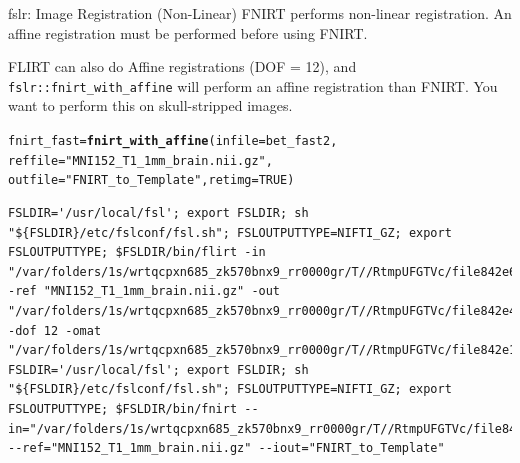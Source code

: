 \documentclass[11pt]{beamer}\usepackage[]{graphicx}\usepackage[]{color}
\makeatletter
\newcommand{\hlnum}[1]{\textcolor[rgb]{0.686,0.059,0.569}{#1}}%
\newcommand{\hlstr}[1]{\textcolor[rgb]{0.192,0.494,0.8}{#1}}%
\newcommand{\hlstd}[1]{\textcolor[rgb]{0.345,0.345,0.345}{#1}}%
\newcommand{\hlkwb}[1]{\textcolor[rgb]{0.69,0.353,0.396}{#1}}%
\newcommand{\hlkwc}[1]{\textcolor[rgb]{0.333,0.667,0.333}{#1}}%
\newcommand{\hlkwd}[1]{\textcolor[rgb]{0.737,0.353,0.396}{\textbf{#1}}}%
\newenvironment{kframe}{%
 \def\at@end@of@kframe{}%
 \ifinner\ifhmode%
  \def\at@end@of@kframe{\end{minipage}}%
  \begin{minipage}{\columnwidth}%
 \fi\fi%
 \def\FrameCommand##1{\hskip\@totalleftmargin \hskip-\fboxsep
 \colorbox{shadecolor}{##1}\hskip-\fboxsep
     \hskip-\linewidth \hskip-\@totalleftmargin \hskip\columnwidth}%
 \MakeFramed {\advance\hsize-\width
   \@totalleftmargin\z@ \linewidth\hsize
   \@setminipage}}%
 {\par\unskip\endMakeFramed%
 \at@end@of@kframe}
\newenvironment{knitrout}{}{} %
\makeatother
\begin{document}
\begin{frame}[fragile]{fslr: Image Registration (Non-Linear)}
FNIRT performs non-linear registration. An affine registration must be performed before using FNIRT.

FLIRT can also do Affine registrations (DOF = 12), and \verb|fslr::fnirt_with_affine| will perform an affine registration than FNIRT.  You want to perform this on skull-stripped images. 


\begin{knitrout}
\color{fgcolor}\begin{kframe}
\begin{alltt}
\hlstd{fnirt_fast} \hlkwb{=} \hlkwd{fnirt_with_affine}\hlstd{(}\hlkwc{infile}\hlstd{=bet_fast2,}
        \hlkwc{reffile} \hlstd{=} \hlstr{"MNI152_T1_1mm_brain.nii.gz"}\hlstd{,}
        \hlkwc{outfile} \hlstd{=} \hlstr{"FNIRT_to_Template"}\hlstd{,} \hlkwc{retimg}\hlstd{=}\hlnum{TRUE}\hlstd{)}
\end{alltt}
\begin{verbatim}
FSLDIR='/usr/local/fsl'; export FSLDIR; sh "${FSLDIR}/etc/fslconf/fsl.sh"; FSLOUTPUTTYPE=NIFTI_GZ; export FSLOUTPUTTYPE; $FSLDIR/bin/flirt -in "/var/folders/1s/wrtqcpxn685_zk570bnx9_rr0000gr/T//RtmpUFGTVc/file842e65483fd1.nii.gz" -ref "MNI152_T1_1mm_brain.nii.gz" -out "/var/folders/1s/wrtqcpxn685_zk570bnx9_rr0000gr/T//RtmpUFGTVc/file842e43b800fa" -dof 12 -omat "/var/folders/1s/wrtqcpxn685_zk570bnx9_rr0000gr/T//RtmpUFGTVc/file842e18295d7a"  
FSLDIR='/usr/local/fsl'; export FSLDIR; sh "${FSLDIR}/etc/fslconf/fsl.sh"; FSLOUTPUTTYPE=NIFTI_GZ; export FSLOUTPUTTYPE; $FSLDIR/bin/fnirt --in="/var/folders/1s/wrtqcpxn685_zk570bnx9_rr0000gr/T//RtmpUFGTVc/file842e43b800fa" --ref="MNI152_T1_1mm_brain.nii.gz" --iout="FNIRT_to_Template"  
\end{verbatim}
\end{kframe}
\end{knitrout}
\end{frame}
\end{document}
